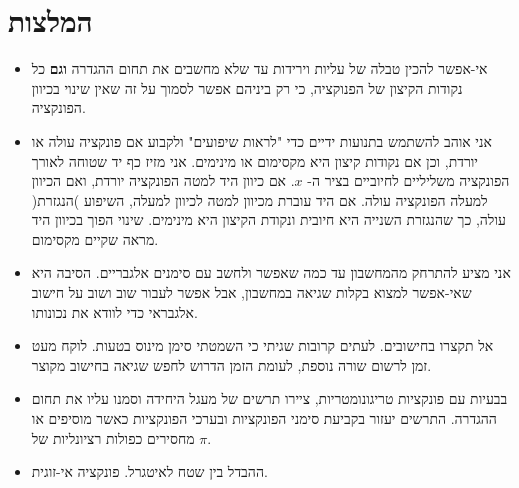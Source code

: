 

\section*{המלצות}


\begin{itemize}
\item
אי-אפשר להכין טבלה של עליות וירידות עד שלא מחשבים את תחום ההגדרה 
\textbf{וגם}
כל נקודות הקיצון של הפנוקציה, כי רק ביניהם אפשר לסמוך על זה שאין שינוי בכיוון הפונקציה.


\item
אני אוהב להשתמש בתנועות ידיים כדי "לראות שיפועים" ולקבוע אם פונקציה עולה או יורדת, וכן אם נקודות קיצון היא מקסימום או מינימים. אני מזיז כף יד שטוחה לאורך הפונקציה משליליים לחיוביים בציר ה-%
$x$.
אם כיוון היד למטה הפונקציה יורדת, ואם הכיוון למעלה הפונקציה עולה. אם היד עוברת מכיוון למטה לכיוון למעלה, השיפוע )הנגזרת( עולה, כך שהנגזרת השנייה היא חיובית ונקודת הקיצון היא מינימים. שינוי הפוך בכיוון היד מראה שקיים מקסימום.

\item
אני מציע להתרחק מהמחשבון עד כמה שאפשר ולחשב עם סימנים אלגבריים. הסיבה היא שאי-אפשר למצוא בקלות שגיאה במחשבון, אבל אפשר לעבור שוב ושוב על חישוב אלגבראי כדי לוודא את נכונותו. 

\item
אל תקצרו בחישובים. לעתים קרובות שגיתי כי השמטתי סימן מינוס בטעות. לוקח מעט זמן לרשום שורה נוספת, לעומת הזמן הדרוש לחפש שגיאה בחישוב מקוצר.

\item
בבעיות עם פונקציות טריגונומטריות, ציירו תרשים של מעגל היחידה וסמנו עליו את תחום ההגדרה. התרשים יעזור בקביעת סימני הפונקציות ובערכי הפונקציות כאשר מוסיפים או מחסירים כפולות רציונליות של 
$\pi$.

\item 
ההבדל בין שטח לאיטגרל. פונקציה אי-זוגית.
\end{itemize}


